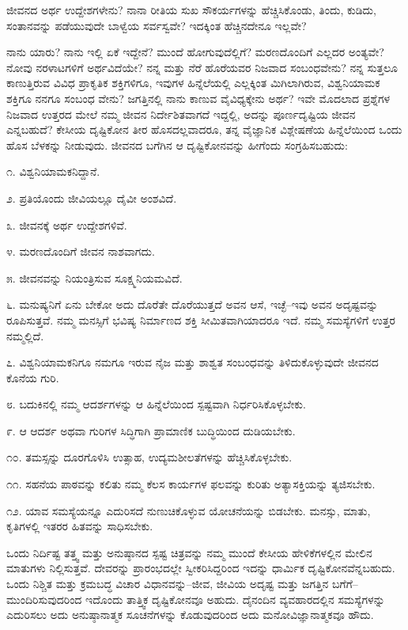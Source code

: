 ಜೀವನದ ಅರ್ಥ ಉದ್ದೇಶಗಳೇನು? ನಾನಾ ರೀತಿಯ ಸುಖ ಸೌಕರ್ಯಗಳನ್ನು ಹೆಚ್ಚಿಸಿಕೊಂಡು, ತಿಂದು, ಕುಡಿದು, ಸಂತಾನವನ್ನು ಪಡೆಯುವುದೇ ಬಾಳ್ವೆಯ ಸರ್ವಸ್ವವೇ? ಇದಕ್ಕಿಂತ ಹೆಚ್ಚಿನದೇನೂ ಇಲ್ಲವೇ?

ನಾನು ಯಾರು? ನಾನು ಇಲ್ಲಿ ಏಕೆ ಇದ್ದೇನೆ? ಮುಂದೆ ಹೋಗುವುದೆಲ್ಲಿಗೆ? ಮರಣ\-ದೊಂದಿಗೆ ಎಲ್ಲದರ ಅಂತ್ಯವೇ? ನೋವು ನರಳಾಟಗಳಿಗೆ ಅರ್ಥವಿದೆಯೇ? ನನ್ನ ಮತ್ತು ನೆರೆ ಹೊರೆಯವರ ನಿಜವಾದ ಸಂಬಂಧವೇನು? ನನ್ನ ಸುತ್ತಲೂ ಕಾಣುತ್ತಿರುವ ವಿವಿಧ ಪ್ರಾಕೃತಿಕ ಶಕ್ತಿಗಳಿಗೂ, ಇವುಗಳ ಹಿನ್ನೆಲೆಯಲ್ಲಿ ಎಲ್ಲಕ್ಕಿಂತ ಮಿಗಿಲಾಗಿರುವ, ವಿಶ್ವನಿಯಾಮಕ ಶಕ್ತಿಗೂ ನನಗೂ ಸಂಬಂಧ ವೇನು? ಜಗತ್ತಿನಲ್ಲಿ ನಾನು ಕಾಣುವ ವೈವಿಧ್ಯಕ್ಕೇನು ಅರ್ಥ? ಇವೇ ಮೊದಲಾದ ಪ್ರಶ್ನೆಗಳ ನಿಜವಾದ ಉತ್ತರದ ಮೇಲೆ ನಮ್ಮ ಜೀವನ ನಿರ್ದೇಶಿತವಾಗದೆ ಇದ್ದಲ್ಲಿ, ಅದನ್ನು ಪೂರ್ಣದೃಷ್ಟಿಯ ಜೀವನ ಎನ್ನಬಹುದೆ? ಕೇಸೀಯ ದೃಷ್ಟಿಕೋನ ತೀರ ಹೊಸದಲ್ಲವಾದರೂ, ತನ್ನ ವೈಜ್ಞಾನಿಕ ವಿಶ್ಲೇಷಣೆಯ ಹಿನ್ನೆಲೆಯಿಂದ ಒಂದು ಹೊಸ ಬೆಳಕನ್ನು ನೀಡುವುದು. ಜೀವನದ ಬಗೆಗಿನ ಆ ದೃಷ್ಟಿಕೋನವನ್ನು ಹೀಗೆಂದು ಸಂಗ್ರಹಿಸಬಹುದು:

೧. ವಿಶ್ವನಿಯಾಮಕನಿದ್ದಾನೆ.

೨. ಪ್ರತಿಯೊಂದು ಜೀವಿಯಲ್ಲೂ ದೈವೀ ಅಂಶವಿದೆ.

೩. ಜೀವನಕ್ಕೆ ಅರ್ಥ ಉದ್ದೇಶಗಳಿವೆ.

೪. ಮರಣದೊಂದಿಗೆ ಜೀವನ ನಾಶವಾಗದು.

೫. ಜೀವನವನ್ನು ನಿಯಂತ್ರಿಸುವ ಸೂಕ್ಷ್ಮನಿಯಮವಿದೆ.

೬. ಮನುಷ್ಯನಿಗೆ ಏನು ಬೇಕೋ ಅದು ದೊರೆತೇ ದೊರೆಯುತ್ತದೆ ಅವನ ಆಸೆ, ಇಚ್ಛೆ–ಇವು ಅವನ ಅದೃಷ್ಟವನ್ನು ರೂಪಿಸುತ್ತವೆ. ನಮ್ಮ ಮನಸ್ಸಿಗೆ ಭವಿಷ್ಯ ನಿರ್ಮಾಣದ ಶಕ್ತಿ ಸೀಮಿತವಾಗಿಯಾದರೂ ಇದೆ. ನಮ್ಮ ಸಮಸ್ಯೆಗಳಿಗೆ ಉತ್ತರ ನಮ್ಮಲ್ಲಿದೆ.

೭. ವಿಶ್ವನಿಯಾಮಕನಿಗೂ ನಮಗೂ ಇರುವ ನೈಜ ಮತ್ತು ಶಾಶ್ವತ ಸಂಬಂಧವನ್ನು ತಿಳಿದು\-ಕೊಳ್ಳುವುದೇ ಜೀವನದ ಕೊನೆಯ ಗುರಿ.

೮. ಬದುಕಿನಲ್ಲಿ ನಮ್ಮ ಆದರ್ಶಗಳನ್ನು ಆ ಹಿನ್ನೆಲೆಯಿಂದ ಸ್ಪಷ್ಟವಾಗಿ ನಿರ್ಧರಿಸಿಕೊಳ್ಳಬೇಕು.

೯. ಆ ಆದರ್ಶ ಅಥವಾ ಗುರಿಗಳ ಸಿದ್ಧಿಗಾಗಿ ಪ್ರಾಮಾಣಿಕ ಬುದ್ಧಿಯಿಂದ ದುಡಿಯಬೇಕು.

೧೦. ತಮಸ್ಸನ್ನು ದೂರಗೊಳಿಸಿ ಉತ್ಸಾಹ, ಉದ್ಯಮಶೀಲತೆಗಳನ್ನು ಹೆಚ್ಚಿಸಿಕೊಳ್ಳಬೇಕು.

೧೧. ಸಹನೆಯ ಪಾಠವನ್ನು ಕಲಿತು ನಮ್ಮ ಕೆಲಸ ಕಾರ್ಯಗಳ ಫಲವನ್ನು ಕುರಿತು ಅತ್ಯಾಸಕ್ತಿಯನ್ನು ತ್ಯಜಿಸಬೇಕು.

೧೨. ಯಾವ ಸಮಸ್ಯೆಯನ್ನೂ ಎದುರಿಸದೆ ನುಣುಚಿಕೊಳ್ಳುವ ಯೋಚನೆಯನ್ನು ಬಿಡಬೇಕು. ಮನಸ್ಸು, ಮಾತು, ಕೃತಿಗಳಲ್ಲಿ ಇತರರ ಹಿತವನ್ನು ಸಾಧಿಸಬೇಕು.

ಒಂದು ನಿರ್ದಿಷ್ಟ ತತ್ತ್ವ ಮತ್ತು ಅನುಷ್ಠಾನದ ಸ್ಪಷ್ಟ ಚಿತ್ರವನ್ನು ನಮ್ಮ ಮುಂದೆ ಕೇಸೀಯ ಹೇಳಿಕೆಗಳಲ್ಲಿನ ಮೇಲಿನ ಮಾತುಗಳು ನಿಲ್ಲಿಸುತ್ತವೆ. ದೇವರನ್ನು ಪ್ರಾರಂಭದಲ್ಲೇ ಸ್ವೀಕರಿಸಿದ್ದರಿಂದ ಇದನ್ನು ಧಾರ್ಮಿಕ ದೃಷ್ಟಿಕೋನವೆನ್ನಬಹುದು. ಒಂದು ನಿಶ್ಚಿತ ಮತ್ತು ಕ್ರಮಬದ್ಧ ವಿಚಾರ ವಿಧಾನವನ್ನು–ಜೀವ, ಜೀವಿಯ ಅದೃಷ್ಟ ಮತ್ತು ಜಗತ್ತಿನ ಬಗೆಗೆ–ಮುಂದಿರಿಸುವುದರಿಂದ ಇದೊಂದು ತಾತ್ತ್ವಿಕ ದೃಷ್ಟಿಕೋನವೂ ಅಹುದು. ದೈನಂದಿನ ವ್ಯವಹಾರದಲ್ಲಿನ ಸಮಸ್ಯೆಗಳನ್ನು ಎದುರಿಸಲು ಅದು ಅನುಷ್ಠಾನಾತ್ಮಕ ಸೂಚನೆಗಳನ್ನು ಕೊಡುವುದರಿಂದ ಅದು ಮನೋ\-ವಿಜ್ಞಾ\-ನಾತ್ಮಕವೂ ಹೌದು.

